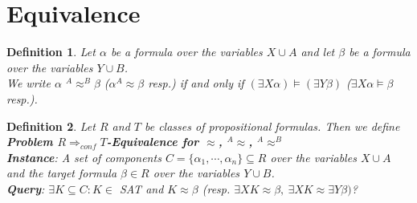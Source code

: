 \documentclass[12pt]{article}
\newcommand{\AM}{\mbox{$^\exists\!\!\models$}}
\newcommand{\AMB}{\mbox{$^\exists\!\!\models^\exists$}}
\newcommand{\AEQB}{\mbox{$^A$\hspace{-0.5mm}$\approx^B$}}
\newcommand{\AEQ}{\mbox{$^A$\hspace{-0.5mm}$\approx$}}
\newtheorem{definition}{Definition}[section]
\newtheorem{theorem}{Theorem}[section]
\begin{document}



\section{Equivalence}


\begin{definition}
Let $\alpha$ be a formula over the variables $X \cup A$ and let $\beta$ be a formula over the variables $Y \cup B$.\\
We write $\alpha $ \AEQB $\beta$ ($\alpha $\AEQ $\beta$ resp.) if and only if
$(\exists X \alpha) \models (\exists Y \beta)$ ($\exists X \alpha \models \beta$ resp.).
\end{definition}





\begin{definition}
Let $R$ and $T$ be classes of propositional formulas. Then we define\\
{\bf Problem $R \Longrightarrow_{conf} T$-Equivalence for $\approx$, \AEQ, \AEQB}\\
{\bf Instance}: A set of components $C=\{\alpha_1,\cdots,\alpha_n\} \subseteq R$ over the variables $X \cup A$ and the target formula $\beta \in R$ over the variables $Y \cup B$.\\
{\bf Query}:
 $ \exists K \subseteq C: K \in$ SAT and $K \approx \beta$ (resp. $\exists X K \approx \beta, \
\exists X K \approx \exists Y \beta)$?\\
\end{definition}
\end{document}
